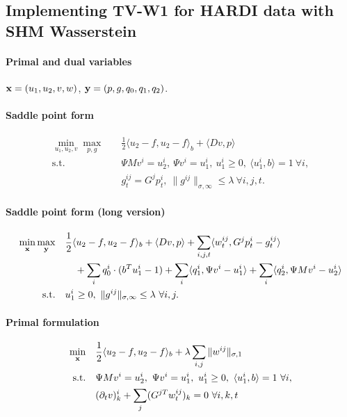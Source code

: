 
\subsection{Implementing TV-W1 for HARDI data with SHM Wasserstein}

\paragraph{Primal and dual variables}
$\mathbf{x} = (u_1,u_2,v,w)$, $\mathbf{y} = (p,g,q_0,q_1,q_2)$.

\paragraph{Saddle point form}
\begin{align*}
    \min_{u_1,u_2,v} \max_{p,g} \quad
        & \frac{1}{2} \langle u_2 - f, u_2 - f \rangle_b + \langle Dv, p \rangle \\
    \text{s.t.}\quad
        & \Psi M v^i = u_2^i, ~\Psi v^i = u_1^i,
          ~u_1^i \geq 0, ~\langle u_1^i, b \rangle = 1 ~\forall i, \\
        & g^{ij}_t = G^j p^i_t,
          ~\|g^{ij}\|_{\sigma,\infty} \leq \lambda ~\forall i,j,t.
\end{align*}

\paragraph{Saddle point form (long version)}
\begin{align*}
    \min_{\mathbf{x}} \max_{\mathbf{y}} \quad
        & \frac{1}{2} \langle u_2 - f, u_2 - f \rangle_b
            + \langle Dv, p \rangle
            + \sum_{i,j,t} \langle w^{ij}_t, G^j p^i_t - g^{ij}_t \rangle \\
        &\quad + \sum_{i} q_0^i \cdot (b^T u_1^i - 1)
            + \sum_{i} \langle q_1^i, \Psi v^i - u_1^i \rangle
            + \sum_{i} \langle q_2^i, \Psi M v^i - u_2^i \rangle \\
    \text{s.t.}\quad
        & u_1^i \geq 0, ~\|g^{ij}\|_{\sigma,\infty} \leq \lambda ~\forall i,j.
\end{align*}

\paragraph{Primal formulation}
\begin{align*}
    \min_{\mathbf{x}} \quad
        & \frac{1}{2} \langle u_2 - f, u_2 - f \rangle_b
            + \lambda \sum_{i,j} \| w^{ij} \|_{\sigma,1} \\
    \text{s.t.}\quad
        & \Psi M v^i = u_2^i, ~\Psi v^i = u_1^i,
          ~u_1^i \geq 0, ~\langle u_1^i, b \rangle = 1 ~\forall i, \\
        & (\partial_t v)_k^i + \sum_j (G^{jT}w^{ij}_t)_{k} = 0 ~\forall i,k,t
\end{align*}

